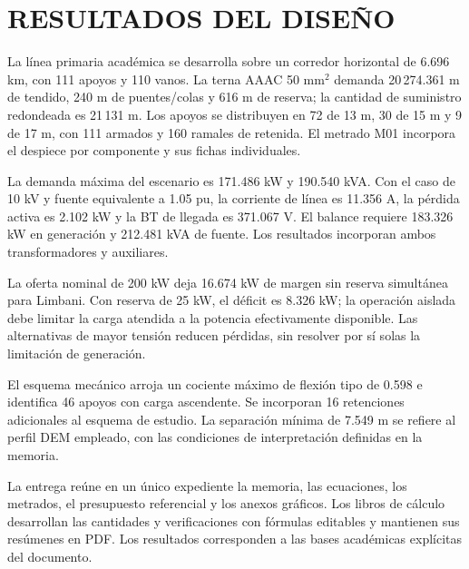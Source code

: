 \chapter{RESULTADOS DEL DISEÑO}
La línea primaria académica se desarrolla sobre un corredor horizontal de 6.696 km, con 111 apoyos y 110 vanos. La terna AAAC 50 mm$^2$ demanda 20\,274.361 m de tendido, 240 m de puentes/colas y 616 m de reserva; la cantidad de suministro redondeada es 21\,131 m. Los apoyos se distribuyen en 72 de 13 m, 30 de 15 m y 9 de 17 m, con 111 armados y 160 ramales de retenida. El metrado M01 incorpora el despiece por componente y sus fichas individuales.

La demanda máxima del escenario es 171.486 kW y 190.540 kVA. Con el caso de 10 kV y fuente equivalente a 1.05 pu, la corriente de línea es 11.356 A, la pérdida activa es 2.102 kW y la BT de llegada es 371.067 V. El balance requiere 183.326 kW en generación y 212.481 kVA de fuente. Los resultados incorporan ambos transformadores y auxiliares.

La oferta nominal de 200 kW deja 16.674 kW de margen sin reserva simultánea para Limbani. Con reserva de 25 kW, el déficit es 8.326 kW; la operación aislada debe limitar la carga atendida a la potencia efectivamente disponible. Las alternativas de mayor tensión reducen pérdidas, sin resolver por sí solas la limitación de generación.

El esquema mecánico arroja un cociente máximo de flexión tipo de 0.598 e identifica 46 apoyos con carga ascendente. Se incorporan 16 retenciones adicionales al esquema de estudio. La separación mínima de 7.549 m se refiere al perfil DEM empleado, con las condiciones de interpretación definidas en la memoria.

La entrega reúne en un único expediente la memoria, las ecuaciones, los metrados, el presupuesto referencial y los anexos gráficos. Los libros de cálculo desarrollan las cantidades y verificaciones con fórmulas editables y mantienen sus resúmenes en PDF. Los resultados corresponden a las bases académicas explícitas del documento.
